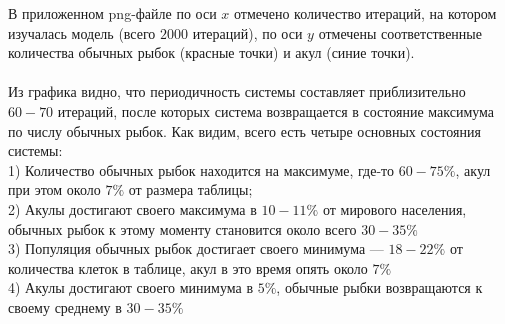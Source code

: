 \documentclass{article}
\begin{document}
В приложенном png-файле по оси $x$ отмечено количество итераций, на котором изучалась модель (всего $2000$ итераций), по оси $y$ отмечены соответственные количества обычных рыбок (красные точки) и акул (синие точки).\\\\ 
Из графика видно, что периодичность системы составляет приблизительно $60-70$ итераций, после которых система возвращается в состояние максимума по числу обычных рыбок. Как видим, всего есть четыре основных состояния системы:\\
1) Количество обычных рыбок находится на максимуме, где-то $60-75\%$, акул при этом около $7\%$ от размера таблицы;\\
2) Акулы достигают своего максимума в $10-11\%$ от мирового населения, обычных рыбок к этому моменту становится около всего $30-35\%$\\
3) Популяция обычных рыбок достигает своего минимума --- $18-22\%$ от количества клеток в таблице, акул в это время опять около $7\%$\\
4) Акулы достигают своего минимума в $5\%$, обычные рыбки возвращаются к своему среднему в $30-35\%$
\end{document}
